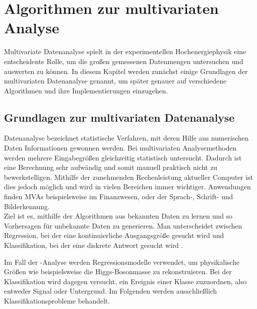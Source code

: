 \chapter{Algorithmen zur multivariaten Analyse}
\label{ch:algorithmen}

{}

Multivariate Datenanalyse spielt in der experimentellen Hochenergiephysik eine entscheidente Rolle, um die gro\ss en gemessenen Datenmengen untersuchen und auswerten zu k\"onnen. In diesem Kapitel werden zun\"achst einige Grundlagen der multivariaten Datenanalyse genannt, um sp\"ater genauer auf verschiedene Algorithmen und ihre Implementierungen einzugehen.

\section{Grundlagen zur multivariaten Datenanalyse}
\label{ch:Theorie:sec:Algorithmen}

Datenanalyse bezeichnet statistische Verfahren, mit deren Hilfe aus numerischen Daten Informationen gewonnen werden.
Bei multivariaten Analysemethoden werden mehrere Eingabegr\"o\ss en gleichzeitig statistisch untersucht. Dadurch ist eine Berechnung sehr aufw\"andig und somit manuell praktisch nicht zu bewerkstelligen. Mithilfe der zunehmenden Rechenleistung aktueller Computer ist dies jedoch m\"oglich und wird in vielen Bereichen immer wichtiger. Anwendungen finden MVAs beispielsweise im Finanzwesen, oder der Sprach-, Schrift- und Bilderkennung.\\
Ziel ist es, mithilfe der Algorithmen aus bekannten Daten zu lernen und so Vorhersagen f\"ur unbekannte Daten zu generieren.
Man unterscheidet zwischen Regression, bei der eine kontinuierliche Ausgangsgr\"o\ss e gesucht wird und Klassifikation, bei der eine diskrete Antwort gesucht wird \cite{SWB-455193959}.

Im Fall der \ttH-Analyse werden Regressionsmodelle verwendet, um physikalische Gr\"o\ss en wie beispielsweise die Higgs-Bosonmasse zu rekonstruieren. Bei der Klassifikation wird dagegen versucht, ein Ereignis einer Klasse zuzuordnen, also entweder Signal oder Untergrund. Im Folgenden werden ausschlie\ss lich Klassifikationsprobleme behandelt.

